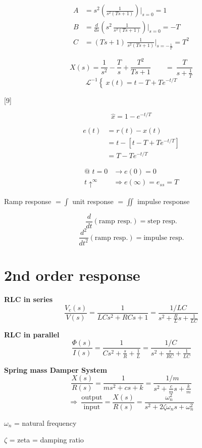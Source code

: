 \documentclass[11pt,a4paper]{article}
\begin{document}
\begin{align*}
A&=s^2\left(\frac{1}{s^2(Ts+1)}\right)\Big|_{s=0}=1\\
B&=\frac{d}{ds}\left(s^2\,\frac{1}{s^2(Ts+1)}\right)\Big|_{s=0}=-T\\
C&=(Ts+1)\,\frac{1}{s^2(Ts+1)}\Big|_{s=-\frac{1}{T}}=T^2
\end{align*}

\[
X(s)=\frac{1}{s^2}-\frac{T}{s}+\frac{T^2}{Ts+1}\qquad=\ \frac{T}{s+\frac{1}{T}}
\]
\[
\mathcal{L}^{-1}\left\{\ x(t)=t-T+Te^{-t/T}\right.
\]

[9]

\[
\hat{x}=1-e^{-t/T}
\]

\begin{align*}
e(t)&=r(t)-x(t)\\
&=t-\left[t-T+Te^{-t/T}\right]\\
&=T-Te^{-t/T}
\end{align*}

\begin{align*}
\text{@ } t=0&\longrightarrow e(0)=0\\
t\uparrow^{\infty}&\Rightarrow e(\infty)=e_{ss}=T
\end{align*}


Ramp response $=\int$ unit response $=\iint$ impulse response

\[
\frac{d}{dt}(\text{ramp resp.})=\text{step resp.}
\]
\[
\frac{d^2}{dt^2}(\text{ramp resp.})=\text{impulse resp.}
\]

\section{2nd order response}
\textbf{RLC in series}
\[
\frac{V_c(s)}{V(s)}=\frac{1}{LCs^2+RCs+1}=\frac{1/LC}{s^2+\frac{R}{L}s+\frac{1}{LC}}
\]

\textbf{RLC in parallel}
\[
\frac{\Phi(s)}{I(s)}=\frac{1}{Cs^2+\frac{s}{R}+\frac{1}{L}}=\frac{1/C}{s^2+\frac{s}{RC}+\frac{1}{LC}}
\]

\textbf{Spring mass Damper System}
\[
\frac{X(s)}{R(s)}=\frac{1}{ms^2+cs+k}=\frac{1/m}{s^2+\frac{c}{m}s+\frac{k}{m}}
\]
\[
\Rightarrow\ \frac{\text{output}}{\text{input}}=\frac{X(s)}{R(s)}=\frac{\omega_n^2}{s^2+2\zeta\omega_n s+\omega_n^2}
\]

$\omega_n$ = natural frequency

$\zeta$ = zeta = damping ratio
\end{document}
